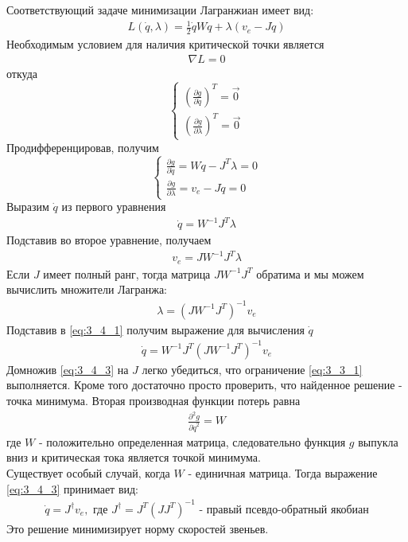 Соответствующий задаче минимизации Лагранжиан имеет вид:
\begin{align*} 
	L(\dot q, \lambda) = \frac{1}{2}\dot q W \dot{q} + \lambda(v_{e} - J\dot q)
\end{align*} 
Необходимым условием для наличия критической точки является
\begin{align*}
	\nabla L = 0
\end{align*}
откуда
\[
	\begin{cases*}
		(\frac{\partial g}{\partial \dot q})^T = \vec{0}\\
		(\frac{\partial g}{\partial \lambda})^T = \vec{0}
	\end{cases*} 
\]
Продифференцировав, получим
\[
	\begin{cases}
		\frac{\partial g}{\partial \dot q} = W\dot{q} - J^{T}\lambda = 0\\
		\frac{\partial g}{\partial \lambda} = v_{e} - J\dot{q} = 0
	\end{cases}
\]
Выразим $\dot q$ из первого уравнения
\begin{align} \label{eq:3_4_1}
	\dot q = W^{-1}J^{T}\lambda
\end{align}
 Подставив во второе уравнение, получаем
\begin{align*}
	v_{e} = JW^{-1}J^{T}\lambda
\end{align*}
Если $J$ имеет полный ранг, тогда матрица $JW^{-1}J^{T}$ обратима и мы можем вычислить множители Лагранжа:
\begin{align} \label{eq:3_4_2}
	\lambda = (JW^{-1}J^{T})^{-1}v_{e}
\end{align}
Подставив в \ref{eq:3_4_1} получим выражение для вычисления $\dot q$
\begin{align} \label{eq:3_4_3}
	\dot q = W^{-1}J^{T}(JW^{-1}J^{T})^{-1}v_{e}
\end{align}
Домножив \ref{eq:3_4_3} на $J$ легко убедиться, что ограничение \ref{eq:3_3_1} выполняется. Кроме того достаточно просто проверить, что найденное решение - точка минимума. Вторая производная функции потерь равна
\begin{align*}
	\frac{\partial^{2}g}{\partial{\dot q}^2} = W
\end{align*}
где $W$ - положительно определенная матрица, следовательно функция $g$ выпукла вниз и критическая тока является точкой минимума.
\\

Существует особый случай, когда $W$ - единичная матрица. Тогда выражение \ref{eq:3_4_3} принимает вид:
\begin{align}
	\dot q = J^{\dagger}v_{e}, \text{ где $J^{\dagger} = J^{T}(JJ^{T})^{-1}$ - правый псевдо-обратный якобиан}
\end{align}
Это решение минимизирует норму скоростей звеньев.

